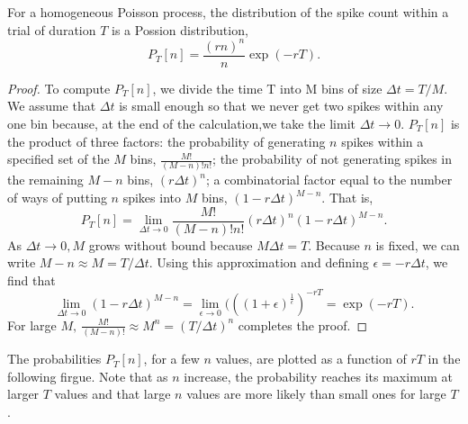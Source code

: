 \begin{thm}
  For a homogeneous Poisson process, the distribution of the spike count within a trial of duration $T$ is a Possion distribution,
  \begin{equation}
    P_T[n]=\frac{(rn)^n}{n}\exp(-rT).
    \label{equ:1.29}
  \end{equation}
  \begin{proof}
    To compute $P_T[n]$, we divide the time T into M bins of size $\Delta t =T/M$. We assume that $\Delta t$ is small enough so that we never get two spikes within any one bin because, at the end of the calculation,we take the limit $\Delta t \to 0$. $P_T[n]$ is the product of three factors: the probability of generating $n$ spikes within a  specified set of the $M$ bins, $\frac{M!}{(M-n)!n!}$; the probability of not generating spikes in the remaining $M - n$ bins, $(r\Delta t)^n$; a combinatorial factor equal to the number of ways of putting $n$ spikes into $M$ bins, $(1-r\Delta t)^{M-n}$. That is,      
    \begin{equation}
      \label{equ:1.27}
      P_T[n]=\lim_{\Delta t \to 0}\frac{M!}{(M-n)!n!}(r\Delta t)^n(1-r\Delta t)^{M-n}.
    \end{equation}
    As $\Delta t \to 0, M$ grows without bound because $ M\Delta t=T$. Because $n$ is fixed, we can write $M-n\approx M=T/\Delta t$. Using this approximation and defining $\epsilon=-r\Delta t$, we find that
    \begin{equation}
      \lim_{\Delta t \to 0}(1-r\Delta t)^{M-n}=\lim_{\epsilon\to 0}(((1+\epsilon)^{\frac{1}{\epsilon}})^{-rT}=\exp(-rT).
    \end{equation}
    For large $M,\ \frac{M!}{(M-n)!}\approx M^n=(T/\Delta t)^n$ completes the proof.
  \end{proof}\qedhere
\end{thm}

\begin{exm}
  The probabilities $P_T[n]$, for a few $n$ values, are plotted as a function of $rT$ in the following firgue. Note that as $n$ increase, the probability reaches its maximum at larger $T$ values and that large $n$ values are more likely than small ones for large $T$.
\end{exm}    

